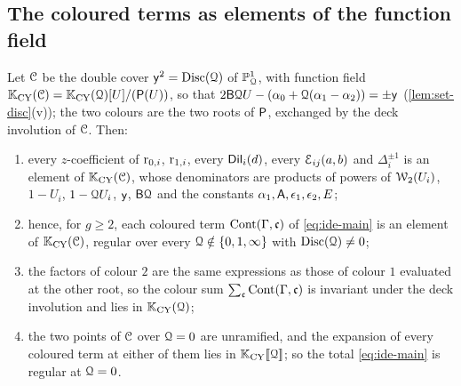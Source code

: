 \subsection{The coloured terms as elements of the function field}

\begin{lem}
\label{lem:ide-terms}
Let $\mathcal{C}$ be the double cover $\mathsf{y}^2=\operatorname{Disc}(\mathcal{Q})$ of $\mathbb{P}^1_{\mathcal{Q}}$, with function field $\mathbb{K}_{\mathrm{CY}}(\mathcal{C})=\mathbb{K}_{\mathrm{CY}}(\mathcal{Q})[U]/(\mathsf{P}(U))$, so that $2\mathsf{B}\mathcal{Q} U-(\alpha_0+\mathcal{Q}(\alpha_1-\alpha_2))=\pm\mathsf{y}$ (\cref{lem:set-disc}(v)); the two colours are the two roots of $\mathsf{P}$, exchanged by the deck involution of $\mathcal{C}$. Then:
\begin{enumerate}
\item every $z$-coefficient of $\mathrm{r}_{0,i}$, $\mathrm{r}_{1,i}$, every $\mathsf{Dil}_i(d)$, every $\mathcal{E}_{ij}(a,b)$ and $\Delta_i^{\pm1}$ is an element of $\mathbb{K}_{\mathrm{CY}}(\mathcal{C})$, whose denominators are products of powers of $\mathcal{W}_2(U_i)$, $1-U_i$, $1-\mathcal{Q} U_i$, $\mathsf{y}$, $\mathsf{B}\mathcal{Q}$ and the constants $\alpha_1,\mathsf{A},\epsilon_1,\epsilon_2,E$;
\item hence, for $g\geq 2$, each coloured term $\mathrm{Cont}(\Gamma,\mathfrak{c})$ of \cref{eq:ide-main} is an element of $\mathbb{K}_{\mathrm{CY}}(\mathcal{C})$, regular over every $\mathcal{Q}\notin\{0,1,\infty\}$ with $\operatorname{Disc}(\mathcal{Q})\neq 0$;
\item the factors of colour $2$ are the same expressions as those of colour $1$ evaluated at the other root, so the colour sum $\sum_{\mathfrak{c}}\mathrm{Cont}(\Gamma,\mathfrak{c})$ is invariant under the deck involution and lies in $\mathbb{K}_{\mathrm{CY}}(\mathcal{Q})$;
\item the two points of $\mathcal{C}$ over $\mathcal{Q}=0$ are unramified, and the expansion of every coloured term at either of them lies in $\mathbb{K}_{\mathrm{CY}}[\![ \mathcal{Q} ]\!]$; so the total \cref{eq:ide-main} is regular at $\mathcal{Q}=0$.
\end{enumerate}
\end{lem}
